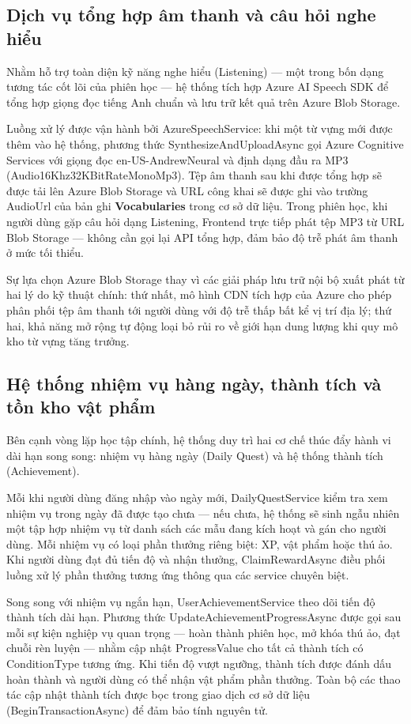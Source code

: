 \subsection{Dịch vụ tổng hợp âm thanh và câu hỏi nghe hiểu}

Nhằm hỗ trợ toàn diện kỹ năng nghe hiểu (Listening) — một trong bốn dạng tương tác cốt lõi của phiên học — hệ thống tích hợp Azure AI Speech SDK để tổng hợp giọng đọc tiếng Anh chuẩn và lưu trữ kết quả trên Azure Blob Storage.

Luồng xử lý được vận hành bởi AzureSpeechService: khi một từ vựng mới được thêm vào hệ thống, phương thức SynthesizeAndUploadAsync gọi Azure Cognitive Services với giọng đọc en-US-AndrewNeural và định dạng đầu ra MP3 (Audio16Khz32KBitRateMonoMp3). Tệp âm thanh sau khi được tổng hợp sẽ được tải lên Azure Blob Storage và URL công khai sẽ được ghi vào trường AudioUrl của bản ghi \textbf{Vocabularies} trong cơ sở dữ liệu. Trong phiên học, khi người dùng gặp câu hỏi dạng Listening, Frontend trực tiếp phát tệp MP3 từ URL Blob Storage — không cần gọi lại API tổng hợp, đảm bảo độ trễ phát âm thanh ở mức tối thiểu.

Sự lựa chọn Azure Blob Storage thay vì các giải pháp lưu trữ nội bộ xuất phát từ hai lý do kỹ thuật chính: thứ nhất, mô hình CDN tích hợp của Azure cho phép phân phối tệp âm thanh tới người dùng với độ trễ thấp bất kể vị trí địa lý; thứ hai, khả năng mở rộng tự động loại bỏ rủi ro về giới hạn dung lượng khi quy mô kho từ vựng tăng trưởng.

\subsection{Hệ thống nhiệm vụ hàng ngày, thành tích và tồn kho vật phẩm}

Bên cạnh vòng lặp học tập chính, hệ thống duy trì hai cơ chế thúc đẩy hành vi dài hạn song song: nhiệm vụ hàng ngày (Daily Quest) và hệ thống thành tích (Achievement).

Mỗi khi người dùng đăng nhập vào ngày mới, DailyQuestService kiểm tra xem nhiệm vụ trong ngày đã được tạo chưa — nếu chưa, hệ thống sẽ sinh ngẫu nhiên một tập hợp nhiệm vụ từ danh sách các mẫu đang kích hoạt và gán cho người dùng. Mỗi nhiệm vụ có loại phần thưởng riêng biệt: XP, vật phẩm hoặc thú ảo. Khi người dùng đạt đủ tiến độ và nhận thưởng, ClaimRewardAsync điều phối luồng xử lý phần thưởng tương ứng thông qua các service chuyên biệt.

Song song với nhiệm vụ ngắn hạn, UserAchievementService theo dõi tiến độ thành tích dài hạn. Phương thức UpdateAchievementProgressAsync được gọi sau mỗi sự kiện nghiệp vụ quan trọng — hoàn thành phiên học, mở khóa thú ảo, đạt chuỗi rèn luyện — nhằm cập nhật ProgressValue cho tất cả thành tích có ConditionType tương ứng. Khi tiến độ vượt ngưỡng, thành tích được đánh dấu hoàn thành và người dùng có thể nhận vật phẩm phần thưởng. Toàn bộ các thao tác cập nhật thành tích được bọc trong giao dịch cơ sở dữ liệu (BeginTransactionAsync) để đảm bảo tính nguyên tử.

